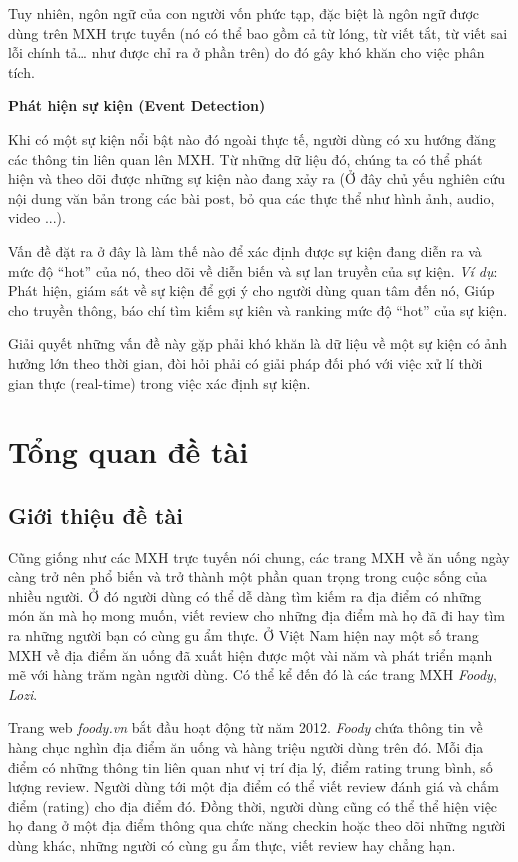 \documentclass[12pt]{extarticle}
\begin{document}
			\par Tuy nhiên, ngôn ngữ của con người vốn phức tạp, đặc biệt là ngôn ngữ được dùng trên MXH trực tuyến (nó có thể bao gồm cả từ lóng, từ viết tắt, từ viết sai lỗi chính tả… như được chỉ ra ở phần trên) do đó gây khó khăn cho việc phân tích.
			\par \textbf{Phát hiện sự kiện (Event Detection)}
			\par Khi có một sự kiện nổi bật nào đó ngoài thực tế, người dùng có xu hướng đăng các thông tin liên quan lên MXH. Từ những dữ liệu đó, chúng ta có thể phát hiện và theo dõi được những sự kiện nào đang xảy ra (Ở đây chủ yếu nghiên cứu nội dung văn bản trong các bài post, bỏ qua các thực thể như hình ảnh, audio, video ...).
			\par Vấn đề đặt ra ở đây là làm thế nào để xác định được sự kiện đang diễn ra và mức độ “hot” của nó, theo dõi về diễn biến và sự lan truyền của sự kiện. \textit{Ví dụ}: Phát hiện, giám sát về sự kiện để gợi ý cho người dùng quan tâm đến nó, Giúp cho truyền thông, báo chí tìm kiếm sự kiên và ranking mức độ “hot” của sự kiện.
			\par Giải quyết những vấn đề này gặp phải khó khăn là dữ liệu về một sự kiện có ảnh hưởng lớn theo thời gian, đòi hỏi phải có giải pháp đối phó với việc xử lí thời gian thực (real-time) trong việc xác định sự kiện.
	
	\section{Tổng quan đề tài}
		\subsection{Giới thiệu đề tài}
			\par Cũng giống như các MXH trực tuyến nói chung, các trang MXH về ăn uống ngày càng trở nên phổ biến và trở thành một phần quan trọng trong cuộc sống của nhiều người. Ở đó người dùng có thể dễ dàng tìm kiếm ra địa điểm có những món ăn mà họ mong muốn, viết review cho những địa điểm mà họ đã đi hay tìm ra những người bạn có cùng gu ẩm thực. Ở Việt Nam hiện nay một số trang MXH về địa điểm ăn uống đã xuất hiện được một vài năm và phát triển mạnh mẽ với hàng trăm ngàn người dùng. Có thể kể đến đó là các trang MXH \textit{Foody}, \textit{Lozi}.
			\par Trang web \textit{foody.vn} bắt đầu hoạt động từ năm 2012. \textit{Foody} chứa thông tin về hàng chục nghìn địa điểm ăn uống và hàng triệu người dùng trên đó. Mỗi địa điểm có những thông tin liên quan như vị trí địa lý, điểm rating trung bình, số lượng review. Người dùng tới một địa điểm có thể viết review đánh giá và chấm điểm (rating) cho địa điểm đó. Đồng thời, người dùng cũng có thể thể hiện việc họ đang ở một địa điểm thông qua chức năng checkin hoặc theo dõi những người dùng khác, những người có cùng gu ẩm thực, viết review hay chẳng hạn.
\end{document}
